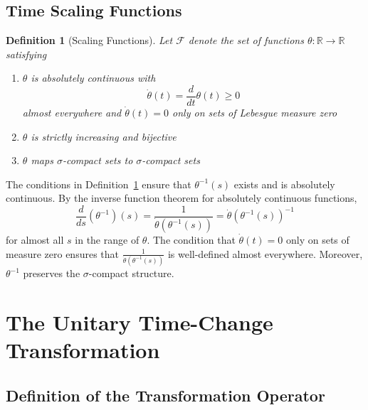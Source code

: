 \documentclass{article}
\newtheorem{definition}{Definition}
\begin{document}
\subsection{Time Scaling Functions}

\begin{definition}
  [Scaling Functions]\label{def:scaling} Let $\mathcal{F}$ denote the set of
  functions $\theta : \mathbb{R} \to \mathbb{R}$ satisfying
  \begin{enumerate}
    \item $\theta$ is absolutely continuous with
    \begin{equation}
      \dot{\theta} (t) = \frac{d}{dt} \theta (t) \geq 0
    \end{equation}
    almost everywhere and $\dot{\theta} (t) = 0$ only on sets of Lebesgue
    measure zero
    
    \item $\theta$ is strictly increasing and bijective
    
    \item $\theta$ maps $\sigma$-compact sets to $\sigma$-compact sets
  \end{enumerate}
\end{definition}

\begin{remark}
  \label{rem:inverse_properties}The conditions in Definition~\ref{def:scaling}
  ensure that $\theta^{- 1} (s)$ exists and is absolutely continuous. By the
  inverse function theorem for absolutely continuous functions,
  \begin{equation}
    \frac{d}{ds} (\theta^{- 1}) (s) = \frac{1}{\dot{\theta} (\theta^{- 1}
    (s))} = \dot{\theta} (\theta^{- 1} (s))^{- 1}
  \end{equation}
  for almost all $s$ in the range of $\theta$. The condition that
  $\dot{\theta} (t) = 0$ only on sets of measure zero ensures that
  $\frac{1}{\dot{\theta} (\theta^{- 1} (s))}$ is well-defined almost
  everywhere. Moreover, $\theta^{- 1}$ preserves the $\sigma$-compact
  structure.
\end{remark}

\section{The Unitary Time-Change Transformation}

\subsection{Definition of the Transformation Operator}
\end{document}
